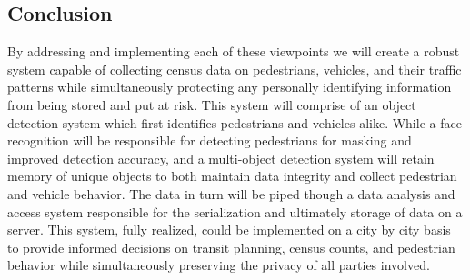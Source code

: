 \documentclass[onecolumn, draftclsnofoot,10pt, compsoc]{IEEEtran}
\begin{document}
\subsection{Conclusion}
By addressing and implementing each of these viewpoints we will create a robust system capable of collecting census data on pedestrians, vehicles, and their traffic patterns while simultaneously protecting any personally identifying information from being stored and put at risk. This system will comprise of an object detection system which first identifies pedestrians and vehicles alike. While a face recognition will be responsible for detecting pedestrians for masking and improved detection accuracy, and a multi-object detection system will retain memory of unique objects to both maintain data integrity and collect pedestrian and vehicle behavior. The data in turn will be piped though a data analysis and access system responsible for the serialization and ultimately storage of data on a server. This system, fully realized, could be implemented on a city by city basis to provide informed decisions on transit planning, census counts, and pedestrian behavior while simultaneously preserving the privacy of all parties involved.
\end{document}
